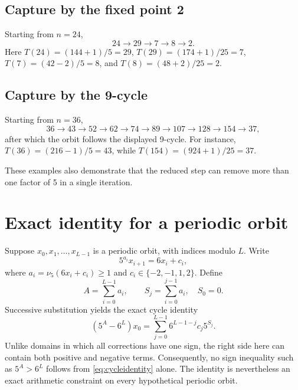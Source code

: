 \documentclass[11pt]{article}
\begin{document}
\subsection*{Capture by the fixed point 2}
Starting from $n=24$,
\[
24\to29\to7\to8\to2.
\]
Here $T(24)=(144+1)/5=29$, $T(29)=(174+1)/25=7$, $T(7)=(42-2)/5=8$, and $T(8)=(48+2)/25=2$.

\subsection*{Capture by the 9-cycle}
Starting from $n=36$,
\[
36\to43\to52\to62\to74\to89\to107\to128\to154\to37,
\]
after which the orbit follows the displayed 9-cycle. For instance, $T(36)=(216-1)/5=43$, while $T(154)=(924+1)/25=37$.

These examples also demonstrate that the reduced step can remove more than one factor of 5 in a single iteration.

\section{Exact identity for a periodic orbit}
Suppose $x_0,x_1,\ldots,x_{L-1}$ is a periodic orbit, with indices modulo $L$. Write
\begin{equation}
5^{a_i}x_{i+1}=6x_i+c_i,
\label{eq:affine}
\end{equation}
where $a_i=\nu_5(6x_i+c_i)\ge1$ and $c_i\in\{-2,-1,1,2\}$. Define
\[
A=\sum_{i=0}^{L-1}a_i,\qquad S_j=\sum_{i=0}^{j-1}a_i,\quad S_0=0.
\]
Successive substitution yields the exact cycle identity
\begin{equation}
(5^A-6^L)x_0=\sum_{j=0}^{L-1}6^{L-1-j}c_j5^{S_j}.
\label{eq:cycleidentity}
\end{equation}
Unlike domains in which all corrections have one sign, the right side here can contain both positive and negative terms. Consequently, no sign inequality such as $5^A>6^L$ follows from \eqref{eq:cycleidentity} alone. The identity is nevertheless an exact arithmetic constraint on every hypothetical periodic orbit.
\end{document}
